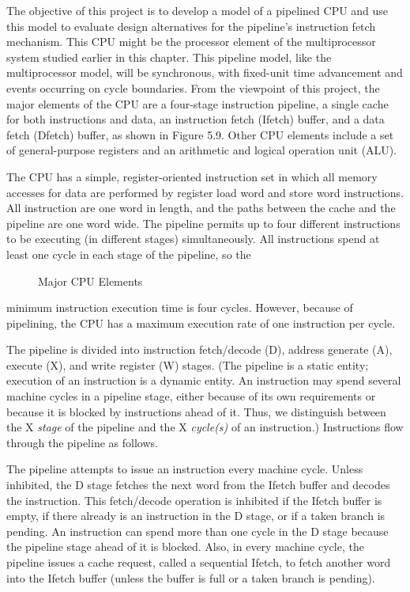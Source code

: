 The objective of this project is to develop a model of a pipelined CPU and
use this model to evaluate design alternatives for the pipeline's instruction
fetch mechanism. This CPU might be the processor element of the multiprocessor
system studied earlier in this chapter. This pipeline model, like
the multiprocessor model, will be synchronous, with fixed-unit time
advancement and events occurring on cycle boundaries. From the viewpoint of
this project, the major elements of the CPU are a four-stage instruction
pipeline, a single cache for both instructions and data, an instruction fetch
(Ifetch) buffer, and a data fetch (Dfetch) buffer, as shown in Figure 5.9.
Other CPU elements include a set of general-purpose registers and an
arithmetic and logical operation unit (ALU).

The CPU has a simple, register-oriented instruction set in which all
memory accesses for data are performed by register load word and store word
instructions. All instruction are one word in length, and the paths between
the cache and the pipeline are one word wide. The pipeline permits up to
four different instructions to be executing (in different stages) simultaneously.
All instructions spend at least one cycle in each stage of the pipeline, so the
\begin{figure}[H]
\centering
\resizebox{.75\linewidth}{!}{}
\caption{Major CPU Elements}
\end{figure}
\noindent minimum instruction execution time is four cycles. However, because of pipelining,
the CPU has a maximum execution rate of one instruction per cycle.



The pipeline is divided into instruction fetch/decode (D), address
generate (A), execute (X), and write register (W) stages. (The pipeline is a
static entity; execution of an instruction is a dynamic entity. An instruction
may spend several machine cycles in a pipeline stage, either because of its
own requirements or because it is blocked by instructions ahead of it. Thus,
we distinguish between the X \emph{stage} of the pipeline and the X \emph{cycle(s)} of an
instruction.) Instructions flow through the pipeline as follows.

The pipeline attempts to issue an instruction every machine cycle.
Unless inhibited, the D stage fetches the next word from the Ifetch buffer
and decodes the instruction. This fetch/decode operation is inhibited if the
Ifetch buffer is empty, if there already is an instruction in the D stage, or if a
taken branch is pending. An instruction can spend more than one cycle in the
D stage because the pipeline stage ahead of it is blocked. Also, in every
machine cycle, the pipeline issues a cache request, called a sequential Ifetch,
to fetch another word into the Ifetch buffer (unless the buffer is full or a
taken branch is pending).

